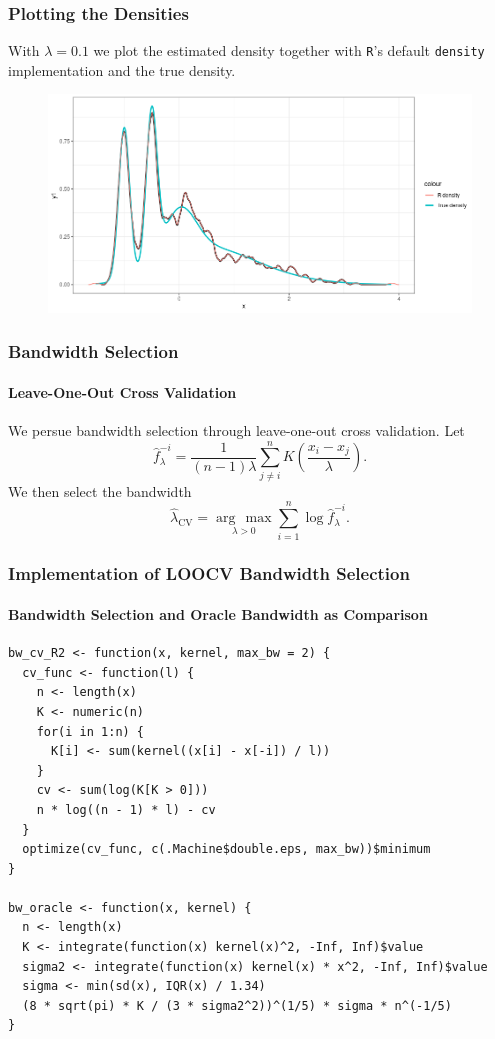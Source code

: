\documentclass[aspectratio=169]{beamer}
\begin{document}
\begin{frame}
  \frametitle{Plotting the Densities}
  With $\lambda = 0.1$ we plot the estimated density together with \texttt{R}'s default \texttt{density} implementation and the true density.
  \begin{figure}
    \centering
    \includegraphics[scale = 0.4]{figure/FirstTest.png}
  \end{figure} 
\end{frame}
\begin{frame}
  \frametitle{Bandwidth Selection}
  \framesubtitle{Leave-One-Out Cross Validation}  
  We persue bandwidth selection through leave-one-out cross validation. Let
  \begin{equation}
    \hat{f}^{-i}_{\lambda}=\frac{1}{(n-1)\lambda}\sum_{j\neq i}^{n}K\left(\frac{x_{i}-x_{j}}{\lambda}\right).
  \end{equation}
  We then select the bandwidth
  \begin{equation}
    \hat{\lambda}_{\text{CV}}=\underset{\lambda > 0}{\arg\,\max}\sum_{i=1}^{n}\log\hat{f}^{-i}_{\lambda}.
  \end{equation}
\end{frame}
\begin{frame}[fragile]
  \frametitle{Implementation of LOOCV Bandwidth Selection}
  \framesubtitle{Bandwidth Selection and Oracle Bandwidth as Comparison}
\begin{verbatim}
bw_cv_R2 <- function(x, kernel, max_bw = 2) {
  cv_func <- function(l) {
    n <- length(x)
    K <- numeric(n)
    for(i in 1:n) {
      K[i] <- sum(kernel((x[i] - x[-i]) / l))
    }
    cv <- sum(log(K[K > 0]))
    n * log((n - 1) * l) - cv
  }
  optimize(cv_func, c(.Machine$double.eps, max_bw))$minimum
}

bw_oracle <- function(x, kernel) {
  n <- length(x)
  K <- integrate(function(x) kernel(x)^2, -Inf, Inf)$value
  sigma2 <- integrate(function(x) kernel(x) * x^2, -Inf, Inf)$value
  sigma <- min(sd(x), IQR(x) / 1.34)
  (8 * sqrt(pi) * K / (3 * sigma2^2))^(1/5) * sigma * n^(-1/5)
}
\end{verbatim}
\end{frame}
\end{document}
